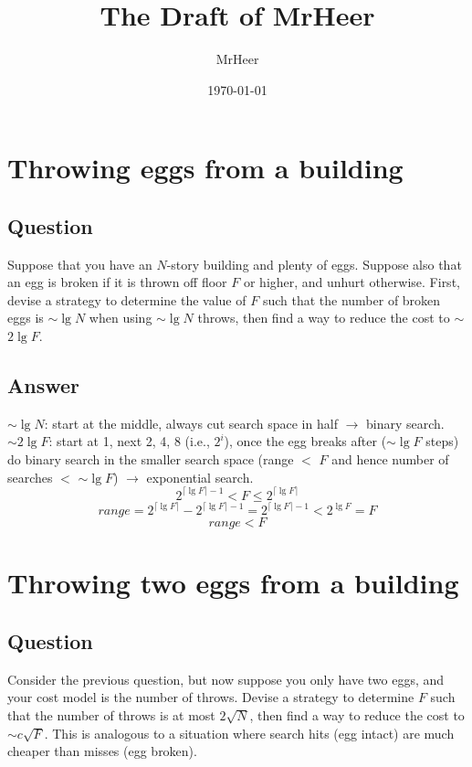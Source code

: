 \documentclass[12pt]{article}
\title{The Draft of MrHeer}
\author{MrHeer}
\date{\today}
\numberwithin{equation}{section}
\begin{document}
\begin{titlepage}
    \maketitle
    \thispagestyle{empty}
\end{titlepage}

\begin{center}
    \tableofcontents
\end{center}

\newpage
{}
\setcounter{page}{1}

\section{Throwing eggs from a building}
\subsection*{Question}
Suppose that you have an $N$-story building and
plenty of eggs. Suppose also that an egg is broken if it is thrown off floor $F$ or higher,
and unhurt otherwise. First, devise a strategy to determine the value of $F$ such that the
number of broken eggs is $\sim$$\lg{N}$ when using $\sim$$\lg{N}$ throws, then find a way to reduce the
cost to $\sim$$2\lg{F}$.
\subsection*{Answer}
$\sim$$\lg{N}$: start at the middle, always cut search space in half $\rightarrow$ binary search.\\
$\sim$$2\lg{F}$: start at 1, next 2, 4, 8 (i.e., $2^i$), once the egg breaks after ($\sim$$\lg{F}$ steps)
do binary search in the smaller search space (range $<$ $F$ and hence number of searches $<$ $\sim$$\lg{F}$)
$\rightarrow$ exponential search.
\[2^{\lceil \lg{F} \rceil - 1} < F \leqslant 2^{\lceil \lg{F} \rceil}\]
\[range = 2^{\lceil \lg{F} \rceil} - 2^{\lceil \lg{F} \rceil - 1}
= 2^{\lceil \lg{F} \rceil - 1} < 2^{\lg{F}} = F\]
\[range < F\]

\newpage
\section{Throwing two eggs from a building}
\subsection*{Question}
Consider the previous question, but now
suppose you only have two eggs, and your cost model is the number of throws. Devise
a strategy to determine $F$ such that the number of throws is at most $2\sqrt{N}$, then find a
way to reduce the cost to $\sim$$c\sqrt{F}$. This is analogous to a situation where search hits (egg
intact) are much cheaper than misses (egg broken).
\end{document}
